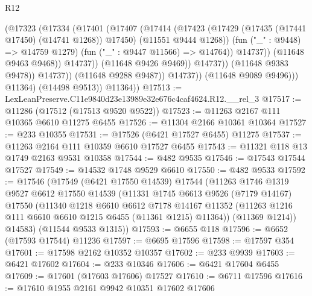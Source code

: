 \begin{lexlean}{R12}
\begin{coremodule}
                                    (@17323
                                      (@17334
                                        (@17401
                                          (@17407
                                            (@17414
                                              (@17423
                                                (@17429
                                                  (@17435 (@17441 @17450) (@14741 @1268))
                                                  @17450)
                                                (@11551 @9444 @1268))
                                              (fun ("_" : @9448) => @14759 @1279)
                                              (fun ("_" : @9447 @11566) => @14764))
                                            @14737))
                                        (@11648 @9463 @9468))
                                      @14737))
                                  (@11648 @9426 @9469))
                                @14737))
                            (@11648 @9383 @9478))
                          @14737))
                      (@11648 @9288 @9487))
                    @14737))
                (@11648 @9089 @9496)))
            @11364)
          (@14498 @9513))
        @11364))
@17513 := LexLeanPreserve.C11e9840d23e13989e32e676c4caf4624.R12.__rel_3
@17517 := @11286 (@17512 (@17513 @9520 @9522))
@17523 := @11263 @2167 @111 @10365 @6610 @11275 @6455
@17526 := @11304 @2166 @10361 @10364
@17527 := @233 @10355
@17531 := @17526 (@6421 @17527 @6455) @11275
@17537 := @11263 @2164 @111 @10359 @6610 @17527 @6455
@17543 := @11321 @118 @13 @1749 @2163 @9531 @10358
@17544 := @482 @9535
@17546 := @17543 @17544 @17527
@17549 := @14532 @1748 @9529 @6610
@17550 := @482 @9533
@17592 := @17546
    (@17549
      (@6421 @17550 @14539)
      @17544
      (@11263
        @1746
        @1319
        @9527
        @6612
        @17550
        @14539
        (@11331
          @1745
          @6613
          @9526
          (@7179 @14167)
          @17550
          (@11340
            @1218
            @6610
            @6612
            @7178
            @14167
            @11352
            (@11263 @1216 @111 @6610 @6610 @1215 @6455 (@11361 @1215) @11364))
          (@11369 @1214))
        @14583)
      (@11544 @9533 @1315))
@17593 := @6655 @118
@17596 := @6652 (@17593 @17544) @11236
@17597 := @6695 @17596
@17598 := @17597 @354
@17601 := @17598 @2162 @10352 @10357
@17602 := @233 @9939
@17603 := @6421 @17602
@17604 := @233 @10346
@17606 := @6421 @17604 @6455
@17609 := @17601 (@17603 @17606) @17527
@17610 := @6711 @17596
@17616 := @17610 @1955 @2161 @9942 @10351 @17602 @17606

\end{coremodule}
\end{lexlean}
